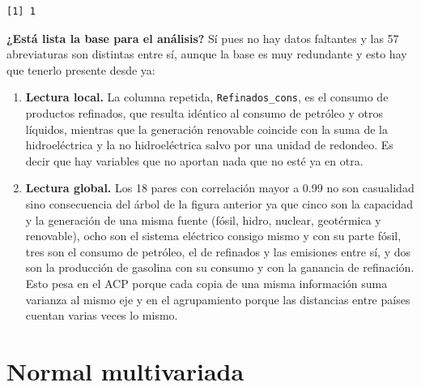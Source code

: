 \documentclass[oneside, openany, fontset=libertinus]{mitthesis}
\newenvironment{Shaded}{\begin{snugshade}}{\end{snugshade}}
\newcommand{\FunctionTok}[1]{\textcolor[rgb]{0.28,0.35,0.67}{#1}}
\newcommand{\NormalTok}[1]{\textcolor[rgb]{0.00,0.23,0.31}{#1}}
\newcommand{\SpecialCharTok}[1]{\textcolor[rgb]{0.37,0.37,0.37}{#1}}
\providecommand{\tightlist}{\setlength{\itemsep}{0pt}\setlength{\parskip}{0pt}}
\newenvironment{codres}%
  {\par\smallskip\noindent\begin{minipage}[t]{0.57\linewidth}\vspace{0pt}}%
  {\end{minipage}\par\medskip}
\newcommand{\codressep}{\end{minipage}\hfill\begin{minipage}[t]{0.40\linewidth}\vspace{0pt}}
\begin{document}
\begin{codres}

\begin{Shaded}
\end{Shaded}

\codressep

\begin{verbatim}
[1] 1
\end{verbatim}

\end{codres}

\textbf{¿Está lista la base para el análisis?} Sí pues no hay datos
faltantes y las 57 abreviaturas son distintas entre sí, aunque la base
es muy redundante y esto hay que tenerlo presente desde ya:

\begin{enumerate}
\def\labelenumi{\alph{enumi}.}
\tightlist
\item
  \textbf{Lectura local.} La columna repetida, \texttt{Refinados\_cons},
  es el consumo de productos refinados, que resulta idéntico al consumo
  de petróleo y otros líquidos, mientras que la generación renovable
  coincide con la suma de la hidroeléctrica y la no hidroeléctrica salvo
  por una unidad de redondeo. Es decir que hay variables que no aportan
  nada que no esté ya en otra.
\item
  \textbf{Lectura global.} Los 18 pares con correlación mayor a 0.99 no
  son casualidad sino consecuencia del árbol de la figura anterior ya
  que cinco son la capacidad y la generación de una misma fuente (fósil,
  hidro, nuclear, geotérmica y renovable), ocho son el sistema eléctrico
  consigo mismo y con su parte fósil, tres son el consumo de petróleo,
  el de refinados y las emisiones entre sí, y dos son la producción de
  gasolina con su consumo y con la ganancia de refinación. Esto pesa en
  el ACP porque cada copia de una misma información suma varianza al
  mismo eje y en el agrupamiento porque las distancias entre países
  cuentan varias veces lo mismo.
\end{enumerate}

\chapter{Normal multivariada}\label{normal}
\end{document}
